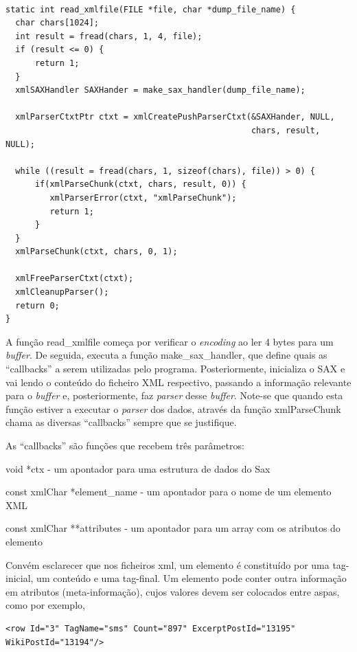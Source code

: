 \documentclass[a4paper]{report}
\begin{document}
\begin{verbatim}

static int read_xmlfile(FILE *file, char *dump_file_name) {
  char chars[1024];
  int result = fread(chars, 1, 4, file);
  if (result <= 0) {
      return 1;
  }
  xmlSAXHandler SAXHander = make_sax_handler(dump_file_name);

  xmlParserCtxtPtr ctxt = xmlCreatePushParserCtxt(&SAXHander, NULL,
                                                  chars, result, NULL);

  while ((result = fread(chars, 1, sizeof(chars), file)) > 0) {
      if(xmlParseChunk(ctxt, chars, result, 0)) {
         xmlParserError(ctxt, "xmlParseChunk");
         return 1;
      }
  }
  xmlParseChunk(ctxt, chars, 0, 1);

  xmlFreeParserCtxt(ctxt);
  xmlCleanupParser();
  return 0;
}
\end{verbatim}

A função read\_xmlfile começa por verificar o \textit{encoding}
ao ler 4 bytes para um \textit{buffer}. De seguida, executa a função make\_sax\_handler,
que define quais as ``callbacks'' a serem utilizadas pelo programa. Posteriormente, inicializa
o SAX e vai lendo o conteúdo do ficheiro XML respectivo, passando a informação
relevante para o \textit{buffer} e, posteriormente, faz \textit{parser} desse \textit{buffer}.
Note-se que quando esta função estiver a executar o \textit{parser} dos dados, através da
função xmlParseChunk chama as diversas ``callbacks'' sempre que se justifique.

As ``callbacks'' são funções que recebem três parâmetros:

\begin{itemize}

\begin{item}void *ctx - um apontador para uma estrutura de dados do Sax \end{item}

\begin{item}const xmlChar *element\_name - um apontador para o nome de um elemento XML\end{item}

\begin{item}const xmlChar **attributes - um apontador para um array com os atributos do elemento\end{item}

\end{itemize}

Convém esclarecer que nos ficheiros xml, um elemento é constituído por uma tag-inicial,
um conteúdo e uma tag-final. Um elemento pode conter outra informação em atributos (meta-informação),
cujos valores devem ser colocados entre aspas, como por exemplo,
\begin{verbatim}
<row Id="3" TagName="sms" Count="897" ExcerptPostId="13195" WikiPostId="13194"/>
\end{verbatim}
\end{document}
